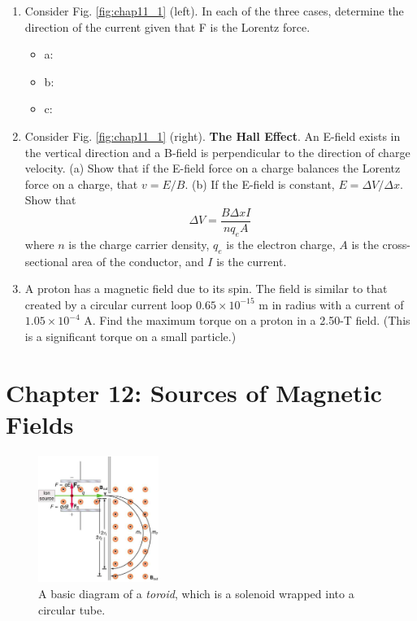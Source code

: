 \documentclass[10pt]{article}
\begin{document}
\begin{enumerate}
\item Consider Fig. \ref{fig:chap11_1} (left).  In each of the three cases, determine the direction of the current given that F is the Lorentz force.
\begin{itemize}
\item a:
\item b:
\item c:
\end{itemize}
\item Consider Fig. \ref{fig:chap11_1} (right).  \textbf{The Hall Effect}.  An E-field exists in the vertical direction and a B-field is perpendicular to the direction of charge velocity.  (a) Show that if the E-field force on a charge balances the Lorentz force on a charge, that $v = E/B$. (b) If the E-field is constant, $E = \Delta V/\Delta x$.  Show that
\begin{equation}
\Delta V = \frac{B\Delta x I}{n q_e A}
\end{equation}
where $n$ is the charge carrier density, $q_e$ is the electron charge, $A$ is the cross-sectional area of the conductor, and $I$ is the current.
\vspace{2cm}
\item A proton has a magnetic field due to its spin. The field is similar to that created by a circular current loop $0.65 \times 10^{-15}$ m in radius with a current of $1.05 \times 10^{-4}$ A.  Find the maximum torque on a proton in a 2.50-T field. (This is a significant torque on a small particle.) \\ \vspace{1cm}
\end{enumerate}

\section{Chapter 12: Sources of Magnetic Fields}

\begin{figure}[ht]
\centering
\includegraphics[width=0.35\textwidth]{vsel.jpeg}
\caption{\label{fig:chap12_1} A basic diagram of a \textit{toroid}, which is a solenoid wrapped into a circular tube.}
\end{figure}
\end{document}
